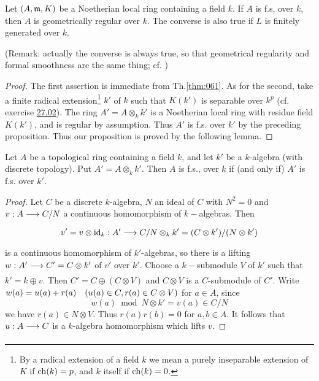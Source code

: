 \documentclass[../main]{subfiles}
\begin{document}
\begin{proposition}
Let $(A, \mathfrak{m}, K)$ be a Noetherian local ring containing a field $k$. If $A$ is f.s, over $k$, then $A$ is geometrically regular over $k$. The converse is also true if $L$ is finitely generated over $k$.

(Remark: actually the converse is always true, so that geometrical regularity and formal smoothness are the same thing; cf. \cite[22.5.8]{egaIV})
\end{proposition}

\begin{proof}
The first assertion is immediate from Th.\ref{thm:061}. As for the second, take a finite radical extension\footnote{By a radical extension of a field $k$ we mean a purely inseparable extension of $K$ if $\operatorname{ch}(k)=p$, and $k$ itself if $\operatorname{ch}(k)=0$.} $k'$ of $k$ such that $K(k')$ is separable over $k^p$ (cf. exercise \hyperref[exe:27.02]{27.02}). The ring $A'=A \otimes_k k'$ is a Noetherian local ring with residue field $K(k')$, and is regular by assumption. Thus $A'$ is f.s. over $k'$ by the preceding proposition. Thus our proposition is proved by the following lemma.
\end{proof}

\begin{parlemma}\label{lem:28.01}
Let $A$ be a topological ring containing a field $k$, and let $k'$ be a $k$-algebra (with discrete topology). Put $A'=A \otimes_k k'$. Then $A$ is f.s., over $k$ if (and only if) $A'$ is f.s. over $k'$.
\end{parlemma}
\begin{proof} 
Let $C$ be a discrete $k$-algebra, $N$ an ideal of $C$ with $N^2=0$ and $v: A \varrightarrow{} C / N$ a continuous homomorphism of $k-$algebras. Then \[v'=v \otimes\id_k: A' \varrightarrow{} C / N \otimes_k k'=(C \otimes k') /(N \otimes k')\] is a continuous homomorphism of $k'$-algebras, so there is a lifting \newline $w:A' \varrightarrow{} C'=C \otimes k'$ of $v'$ over $k'$. Choose a $k-$submodule $V$ of $k'$ such that $k'=k \oplus v$. Then $C'=C \oplus(C \otimes V)$ and $C \otimes V$ is a $C$-submodule of $C'$. Write $w(a)=u(a)+r(a)\for{u(a) \in C, r(a) \in C \otimes V}$ for $a \in A$, since \[w(a) \bmod N \otimes k'=v(a) \in C / N\] we have $r(a) \in N \otimes V$. Thus $r(a) r(b)=0$ for $a, b \in A$. It follows that $u: A \varrightarrow{} C$ is a $k$-algebra homomorphism which lifts $v$.
\end{proof}
\end{document}

